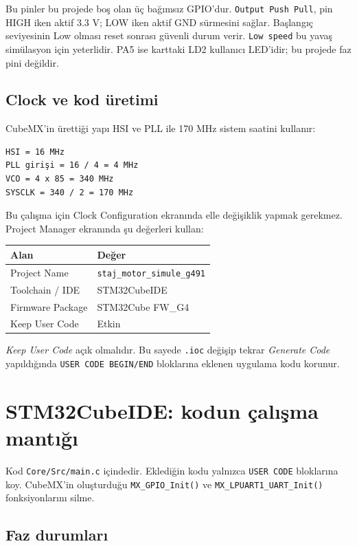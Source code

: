 \documentclass[11pt,a4paper]{article}
\begin{document}
Bu pinler bu projede boş olan üç bağımsız GPIO'dur. \texttt{Output Push Pull},
pin HIGH iken aktif 3.3 V; LOW iken aktif GND sürmesini sağlar. Başlangıç
seviyesinin Low olması reset sonrası güvenli durum verir. \texttt{Low speed}
bu yavaş simülasyon için yeterlidir. PA5 ise karttaki LD2 kullanıcı LED'idir;
bu projede faz pini değildir.

\subsection{Clock ve kod üretimi}

CubeMX'in ürettiği yapı HSI ve PLL ile 170 MHz sistem saatini kullanır:

\begin{lstlisting}
HSI = 16 MHz
PLL girişi = 16 / 4 = 4 MHz
VCO = 4 x 85 = 340 MHz
SYSCLK = 340 / 2 = 170 MHz
\end{lstlisting}

Bu çalışma için Clock Configuration ekranında elle değişiklik yapmak gerekmez.
Project Manager ekranında şu değerleri kullan:

\begin{center}
\begin{tabular}{ll}
\toprule
Alan & Değer \\
\midrule
Project Name & \texttt{staj\_motor\_simule\_g491} \\
Toolchain / IDE & STM32CubeIDE \\
Firmware Package & STM32Cube FW\_G4 \\
Keep User Code & Etkin \\
\bottomrule
\end{tabular}
\end{center}

\textit{Keep User Code} açık olmalıdır. Bu sayede \texttt{.ioc} değişip tekrar
\textit{Generate Code} yapıldığında \texttt{USER CODE BEGIN/END} bloklarına
eklenen uygulama kodu korunur.

\section{STM32CubeIDE: kodun çalışma mantığı}

Kod \texttt{Core/Src/main.c} içindedir. Eklediğin kodu yalnızca
\texttt{USER CODE} bloklarına koy. CubeMX'in oluşturduğu
\texttt{MX\_GPIO\_Init()} ve \texttt{MX\_LPUART1\_UART\_Init()} fonksiyonlarını
silme.

\subsection{Faz durumları}
\end{document}
